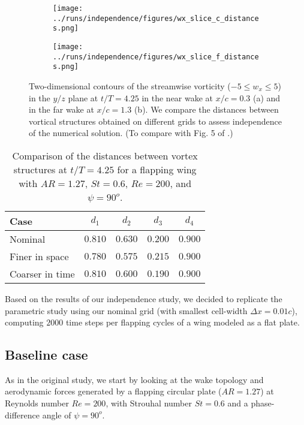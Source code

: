 \begin{figure}
  \centering
  \begin{subfigure}[c]{0.45\textwidth}
    \centering
    \texttt{[image: ../runs/independence/figures/wx\_slice\_c\_distances.png]}
    \caption{}
  \end{subfigure}
  \hfill
  \begin{subfigure}[c]{0.45\textwidth}
    \centering
    \texttt{[image: ../runs/independence/figures/wx\_slice\_f\_distances.png]}
    \caption{}
  \end{subfigure}
  \caption{Two-dimensional contours of the streamwise vorticity ($-5 \leq w_x \leq 5$) in the $y/z$ plane at $t/T = 4.25$ in the near wake at $x / c = 0.3$ (a) and in the far wake at $x / c = 1.3$ (b). We compare the distances between vortical structures obtained on different grids to assess independence of the numerical solution. (To compare with Fig. 5 of \citet{li_dong_2016}.)}
  \label{fig:independence_wx_distances}
\end{figure}

\begin{table}
  \centering
  \begin{tabular}{lcccc}
    \hline\hline
    Case & $d_1$ & $d_2$ & $d_3$ & $d_4$ \\
    \hline
    Nominal & $0.810$ & $0.630$ & $0.200$ & $0.900$ \\
    Finer in space & $0.780$ & $0.575$ & $0.215$ & $0.900$ \\
    Coarser in time & $0.810$ & $0.600$ & $0.190$ & $0.900$ \\
    \hline\hline
  \end{tabular}
  \caption{Comparison of the distances between vortex structures at $t / T = 4.25$ for a flapping wing with $AR = 1.27$, $St = 0.6$, $Re = 200$, and $\psi = 90^o$.}
  \label{tab:independence_wx_distances}
\end{table}

Based on the results of our independence study, we decided to replicate the parametric study using our nominal grid (with smallest cell-width $\Delta x = 0.01c$), computing $2000$ time steps per flapping cycles of a wing modeled as a flat plate.

\subsection{Baseline case}

As in the original study, we start by looking at the wake topology and aerodynamic forces generated by a flapping circular plate ($AR = 1.27$) at Reynolds number $Re = 200$, with Strouhal number $St = 0.6$ and a phase-difference angle of $\psi = 90^o$.

